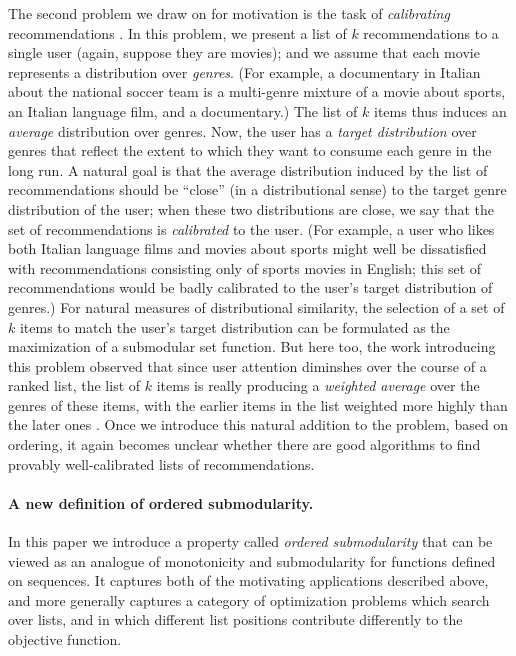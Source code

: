 The second problem we draw on for motivation is the task of
{\em calibrating} recommendations \cite{Steck18}.
In this problem, we present a list of $k$ recommendations
to a single user (again, suppose they are movies);
and we assume that each movie represents a distribution over {\em genres}.
(For example, a documentary in Italian about the national soccer team is a multi-genre mixture of a movie about sports, an Italian language film, and a documentary.)
The list of $k$ items thus induces an {\em average} distribution
over genres.
Now, the user has a {\em target distribution} over genres that
reflect the extent to which they want to consume each genre
in the long run.
A natural goal is that the average distribution induced by the
list of recommendations should be ``close'' (in a distributional sense)
to the target genre distribution of the user;
when these two distributions are close, we say that the set of
recommendations is {\em calibrated} to the user.
(For example, a user who likes both Italian language films and movies about sports might well be dissatisfied with recommendations consisting only of sports movies in English;
this set of recommendations would be badly calibrated to the
user's target distribution of genres.) 
For natural measures of distributional similarity, the selection of a
set of $k$ items to match the user's target distribution can be
formulated as the maximization of a submodular set function.
But here too, the work introducing this problem observed that since
user attention diminshes over the course of a ranked list, the
list of $k$ items is really producing a {\em weighted average} over
the genres of these items, with the earlier items in the list 
weighted more highly than the later ones \cite{Steck18}.
Once we introduce this natural addition to the problem, based on
ordering, it again
becomes unclear whether there are good algorithms to find provably
well-calibrated lists of recommendations.

\paragraph{\bf A new definition of ordered submodularity.}
In this paper we introduce a property called {\em ordered submodularity}
that can be viewed as an analogue of monotonicity and submodularity
for functions defined on sequences.
It captures both of the motivating applications described above,
and more generally captures a category of optimization problems 
which search over lists, and in which different list positions 
contribute differently to the objective function.

